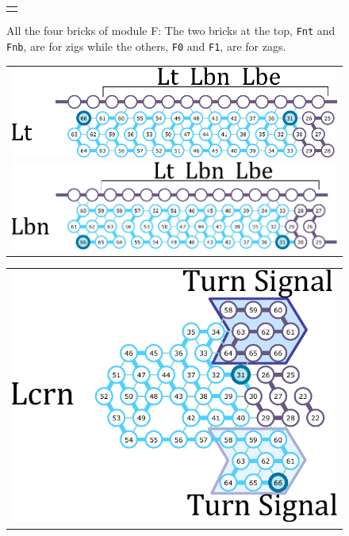 \documentclass[twocolumn]{svjour3}
\begin{document}
\begin{figure}[tb]
\begin{tabular}{c}
\begin{minipage}{0.5\linewidth}
 \end{minipage}
 \end{tabular}
 \caption{All the four bricks of module F: The two bricks at the top, \texttt{Fnt} and \texttt{Fnb}, are for zigs while the others, \texttt{F0} and \texttt{F1}, are for zags. }
 \label{fig:formatters}
\end{figure}



\begin{figure}[tb]
\begin{tabular}{c}
 \begin{minipage}{0.5\linewidth}
  \centering
   \includegraphics[width=0.9\linewidth]{fig/svg/Lt_3.pdf}
 \end{minipage}
 
 \begin{minipage}{0.5\linewidth}
  \centering
   \includegraphics[width=0.9\linewidth]{fig/svg/Lbc_3.pdf}

 \end{minipage}
 \end{tabular}

\vspace*{3mm}

\begin{tabular}{c}
 \begin{minipage}{0.5\linewidth}
  \centering
   \includegraphics[width=0.8\linewidth]{fig/svg/Ltrc_3.pdf}
 \end{minipage}
 

\end{tabular}
\end{figure}
\end{document}
